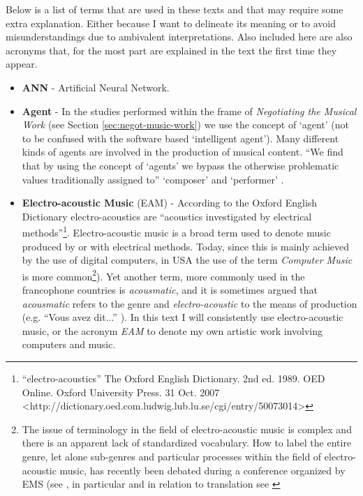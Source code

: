 Below is a list of terms that are used in these texts and that may
require some extra explanation.  Either because I want to delineate
its meaning or to avoid misunderstandings due to ambivalent
interpretations. Also included here are also acronyms
that, for the most part are explained in the text the first time they
appear.

\begin{itemize} %

\item \textbf{ANN} - Artificial Neural Network.

\item \textbf{Agent} - In the studies performed within the frame of
  \emph{Negotiating the Musical Work} (see Section
  \ref{sec:negot-music-work}) we use the concept of `agent' (not to be
  confused with the software based `intelligent agent'). Many
  different kinds of agents are involved in the production of musical
  content. ``We find that by using the concept of `agents' we bypass
  the otherwise problematic values traditionally assigned to''
  `composer' and `performer' \citetext{see also \citealp[p.
    35]{wis96}}.

\item \textbf{Electro-acoustic Music} (EAM) - According to the Oxford
  English Dictionary electro-acoustics are ``acoustics investigated by
  electrical methods''\footnote{``electro-acoustics'' The Oxford
    English Dictionary. 2nd ed. 1989. OED Online. Oxford University
    Press. 31 Oct. 2007 
    <http://dictionary.oed.com.ludwig.lub.lu.se/cgi/entry/50073014>}.
  Electro-acoustic music is a broad term used to denote music produced
  by or with electrical methods. Today, since this is mainly achieved
  by the use of digital computers, in USA the use of the term
  \emph{Computer Music} is more common\footnote{The issue of
    terminology in the field of electro-acoustic music is complex and
    there is an apparent lack of standardized vocabulary. How to
    label the entire genre, let alone sub-genres and particular
    processes within the field of electro-acoustic music, has recently
    been debated during a conference organized by EMS (see
    \citealp{EMS06}, in particular \citealp{landy06,dack06,battier06} and
    in relation to translation see \citealp{fields06}}). Yet another
  term, more commonly used in the francophone countries is
  \emph{acousmatic}, and it is sometimes argued that \emph{acousmatic}
  refers to the genre and \emph{electro-acoustic} to the means of
  production (e.g.  ``Vous avez dit...''
  \citeyear{musique-recherche}). In this text I will consistently use
  electro-acoustic music, or the acronym \emph{EAM} to denote my own
  artistic work involving computers and music.
   

\end{itemize}
